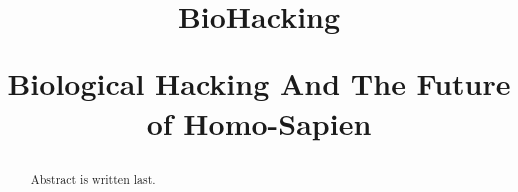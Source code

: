 \documentclass{article}
\title{BioHacking \\
\begin{large} 
    Biological Hacking And The Future of Homo-Sapien
\end{large} }	%
\begin{document}
\maketitlepage
\newpage


\begin{abstract}
    Abstract is written last.
\end{abstract}
\newpage

\makeheader	%
\maketitle	%






\newpage
\makeworkscited
\end{document}
